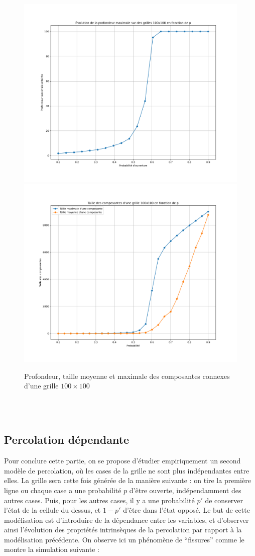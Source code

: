 \documentclass[11pt,a4paper]{article}
\begin{document}
\begin{figure}[htp]

\centering
\includegraphics[width=.5\textwidth]{./Pictures/profondeur.png}\hfill
\includegraphics[width=.5\textwidth]{./Pictures/taille.png}

\caption{Profondeur, taille moyenne et maximale des composantes connexes d'une grille $100\times 100$}
\label{fig:depth_size}

\end{figure}

~\\
~\\

\subsection{Percolation dépendante}

Pour conclure cette partie, on se propose d'étudier empiriquement un second modèle de percolation, où les cases de la grille ne sont plus indépendantes entre elles. La grille sera cette fois générée de la manière suivante : on tire la première ligne ou chaque case a une probabilité $p$ d'être ouverte, indépendamment des autres cases. Puis, pour les autres cases, il y a une probabilité $p'$ de conserver l'état de la cellule du dessus, et $1-p'$ d'être dans l'état opposé. Le but de cette modélisation est d'introduire de la dépendance entre les variables, et d'observer ainsi l'évolution des propriétés intrinsèques de la percolation par rapport à la modélisation précédente. On observe ici un phénomène de ``fissures'' comme le montre la simulation suivante :
\end{document}
